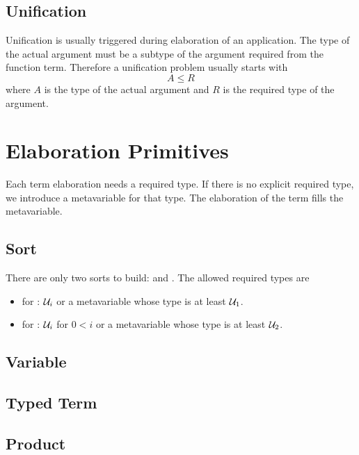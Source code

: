 \subsection{Unification}

Unification is usually triggered during elaboration of an application. The type
of the actual argument must be a subtype of the argument required from the
function term. Therefore a unification problem usually starts with
$$
    A \le R
$$
where $A$ is the type of the actual argument and $R$ is the required type of the
argument.



\section{Elaboration Primitives}

Each term elaboration needs a required type. If there is no explicit required
type, we introduce a metavariable for that type. The elaboration of the term
fills the metavariable.



\subsection{Sort}

There are only two sorts to build:  and . The
allowed required types are
\begin{itemize}

\item for : ${\cal{U}}_i$ or a metavariable whose type is
at least ${\cal{U}}_1$.

\item for : ${\cal{U}}_i$ for $0 < i$ or a metavariable whose type is at
least ${\cal{U}}_2$.

\end{itemize}



\subsection{Variable}


\subsection{Typed Term}


\subsection{Product}



